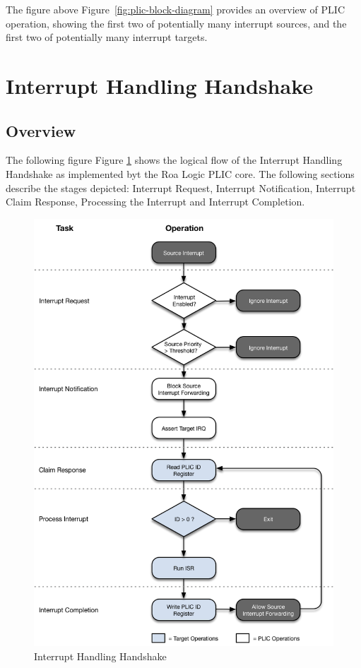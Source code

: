 \ifdefined\MARKDOWN
The figure above
\else
Figure~\ref{fig:plic-block-diagram} 
\fi
 provides an overview of PLIC operation, showing the first two of potentially many interrupt sources, and the first two of potentially many interrupt targets. 

\section{Interrupt Handling Handshake}

\subsection{Overview}

\ifdefined\MARKDOWN
The following figure
\else
Figure \ref{fig:HANDSHAKE} 
\fi
shows the logical flow of the Interrupt Handling Handshake as implemented byt the Roa Logic PLIC core. The following sections describe the stages depicted: Interrupt Request, Interrupt Notification, Interrupt Claim Response, Processing the Interrupt and Interrupt Completion.

\begin{figure}[!htb]

\includegraphics{assets/img/plic-handshake}
\caption{Interrupt Handling Handshake}
\label{fig:HANDSHAKE}
\end{figure}

